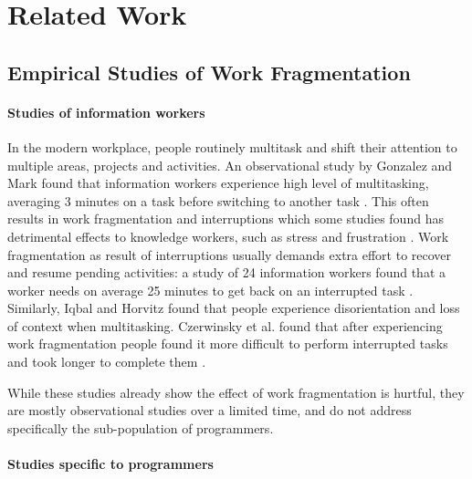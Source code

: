 \documentclass[times]{smrauth}
\begin{document}
\section{Related Work}

\subsection{Empirical Studies of Work Fragmentation}

\paragraph{Studies of information workers}
In the modern workplace, people routinely multitask and shift their attention to multiple areas, projects and activities. An observational study by Gonzalez and Mark found that information workers experience high level of multitasking, averaging 3 minutes on a task before switching to another task \cite{GM04}. This often results in work fragmentation and interruptions which some studies found has detrimental effects to knowledge workers, such as stress and frustration \cite{MGK08}. Work fragmentation as result of interruptions usually demands extra effort to recover and resume pending activities: a study of 24 information workers found that a worker needs on average 25 minutes to get back on an interrupted task \cite{MGH05}. Similarly, Iqbal and Horvitz \cite{IH07} found that people experience disorientation and loss of context when multitasking. Czerwinsky et al. found that after experiencing work fragmentation people found it more difficult to perform interrupted tasks and took longer to complete them \cite{CHW04}. %

While these studies already show the effect of work fragmentation is hurtful, they are mostly observational studies over a limited time, and do not address specifically the sub-population of programmers.

\paragraph{Studies specific to programmers}
\end{document}
